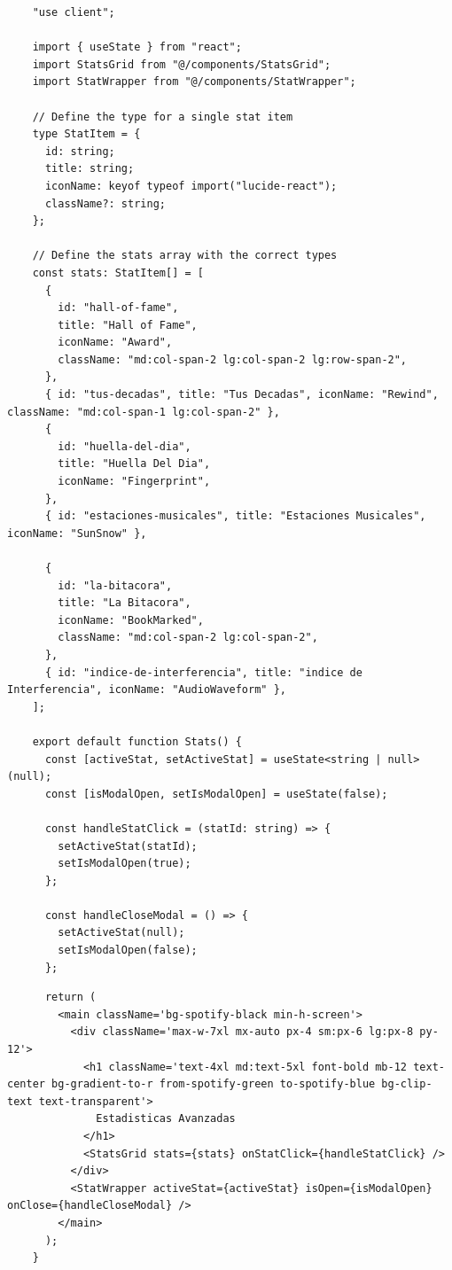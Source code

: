 \begin{ifalgorithm}[H]
  \begin{lstlisting}
    "use client";

    import { useState } from "react";
    import StatsGrid from "@/components/StatsGrid";
    import StatWrapper from "@/components/StatWrapper";

    // Define the type for a single stat item
    type StatItem = {
      id: string;
      title: string;
      iconName: keyof typeof import("lucide-react");
      className?: string;
    };

    // Define the stats array with the correct types
    const stats: StatItem[] = [
      {
        id: "hall-of-fame",
        title: "Hall of Fame",
        iconName: "Award",
        className: "md:col-span-2 lg:col-span-2 lg:row-span-2",
      },
      { id: "tus-decadas", title: "Tus Decadas", iconName: "Rewind", className: "md:col-span-1 lg:col-span-2" },
      {
        id: "huella-del-dia",
        title: "Huella Del Dia",
        iconName: "Fingerprint",
      },
      { id: "estaciones-musicales", title: "Estaciones Musicales", iconName: "SunSnow" },

      {
        id: "la-bitacora",
        title: "La Bitacora",
        iconName: "BookMarked",
        className: "md:col-span-2 lg:col-span-2",
      },
      { id: "indice-de-interferencia", title: "indice de Interferencia", iconName: "AudioWaveform" },
    ];

    export default function Stats() {
      const [activeStat, setActiveStat] = useState<string | null>(null);
      const [isModalOpen, setIsModalOpen] = useState(false);

      const handleStatClick = (statId: string) => {
        setActiveStat(statId);
        setIsModalOpen(true);
      };

      const handleCloseModal = () => {
        setActiveStat(null);
        setIsModalOpen(false);
      };
    \end{lstlisting}
  \caption{Definición del componente \texttt{Stats}, encargado de gestionar y renderizar la interfaz de las estadísticas avanzadas (Parte 1/2).}
  \label{alg:stats_component_1}
\end{ifalgorithm}

\begin{ifalgorithm}[H]
  \begin{lstlisting}
      return (
        <main className='bg-spotify-black min-h-screen'>
          <div className='max-w-7xl mx-auto px-4 sm:px-6 lg:px-8 py-12'>
            <h1 className='text-4xl md:text-5xl font-bold mb-12 text-center bg-gradient-to-r from-spotify-green to-spotify-blue bg-clip-text text-transparent'>
              Estadisticas Avanzadas
            </h1>
            <StatsGrid stats={stats} onStatClick={handleStatClick} />
          </div>
          <StatWrapper activeStat={activeStat} isOpen={isModalOpen} onClose={handleCloseModal} />
        </main>
      );
    }
    \end{lstlisting}
  \caption{Definición del componente \texttt{Stats}, encargado de gestionar y renderizar la interfaz de las estadísticas avanzadas (Parte 2/2).}
  \label{alg:stats_component_2}
\end{ifalgorithm}

